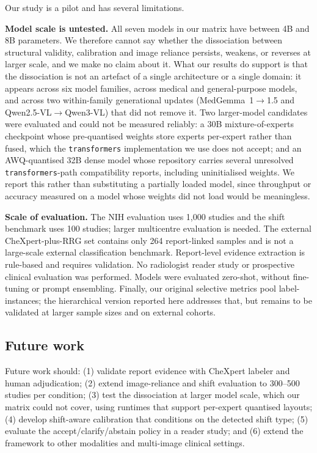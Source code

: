 Our study is a pilot and has several limitations.

\textbf{Model scale is untested.} All seven models in our matrix have between 4B
and 8B parameters. We therefore cannot say whether the dissociation between
structural validity, calibration and image reliance persists, weakens, or reverses
at larger scale, and we make no claim about it. What our results do support is
that the dissociation is not an artefact of a single architecture or a single
domain: it appears across six model families, across medical and general-purpose
models, and across two within-family generational updates
(MedGemma~1$\rightarrow$1.5 and Qwen2.5-VL$\rightarrow$Qwen3-VL) that did not
remove it. Two larger-model candidates were evaluated and could not be measured
reliably: a 30B mixture-of-experts checkpoint whose pre-quantised weights store
experts per-expert rather than fused, which the \texttt{transformers}
implementation we use does not accept; and an AWQ-quantised 32B dense model whose
repository carries several unresolved \texttt{transformers}-path compatibility
reports, including uninitialised weights. We report this rather than substituting
a partially loaded model, since throughput or accuracy measured on a model whose
weights did not load would be meaningless.

\textbf{Scale of evaluation.} The NIH evaluation uses 1,000 studies and the shift
benchmark uses 100 studies; larger multicentre evaluation is needed. The external
CheXpert-plus-RRG set contains only 264 report-linked samples and is not a
large-scale external classification benchmark. Report-level evidence extraction is
rule-based and requires validation. No radiologist reader study or prospective
clinical evaluation was performed. Models were evaluated zero-shot, without
fine-tuning or prompt ensembling. Finally, our original selective metrics pool
label-instances; the hierarchical version reported here addresses that, but
remains to be validated at larger sample sizes and on external cohorts.

\subsection{Future work}

Future work should: (1) validate report evidence with CheXpert labeler and human adjudication; (2) extend image-reliance and shift evaluation to 300--500 studies per condition; (3) test the dissociation at larger model scale, which our matrix could not cover, using runtimes that support per-expert quantised layouts; (4) develop shift-aware calibration that conditions on the detected shift type; (5) evaluate the accept/clarify/abstain policy in a reader study; and (6) extend the framework to other modalities and multi-image clinical settings.
